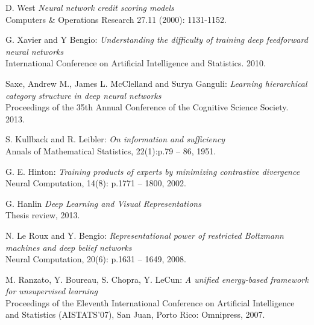 \documentclass[a4paper,11pt]{report}
\begin{document}
\begin{thebibliography}{99}
	 D. West {\em Neural network credit scoring models}\\
	Computers \& Operations Research 27.11 (2000): 1131-1152.
	
	 G. Xavier and Y Bengio: {\em Understanding the difficulty of training deep feedforward neural networks}\\
	International Conference on Artificial Intelligence and Statistics. 2010.
	
	 Saxe, Andrew M., James L. McClelland and Surya Ganguli: {\em Learning hierarchical category structure in deep neural networks}\\
	Proceedings of the 35th Annual Conference of the Cognitive Science Society. 2013.

	 S. Kullback and R. Leibler: {\em On information and sufficiency}\\
	Annals of Mathematical Statistics, 22(1):p.79 – 86, 1951.
	
	 G. E. Hinton: {\em Training products of experts by minimizing contrastive divergence}\\
	Neural Computation, 14(8): p.1771 – 1800, 2002.
	
	 G. Hanlin {\em Deep Learning and Visual Representations}\\
	Thesis review, 2013.
	
	 N. Le Roux and Y. Bengio: {\em Representational power of restricted Boltzmann machines and deep belief networks}\\
	Neural Computation, 20(6): p.1631 – 1649, 2008.
	
	 M. Ranzato, Y. Boureau, S. Chopra, Y. LeCun: {\em A unified energy-based framework for unsupervised learning}\\
	Proceedings of the Eleventh International Conference on Artificial Intelligence and Statistics (AISTATS’07), San Juan, Porto Rico: Omnipress, 2007.
\end{thebibliography}
     
\end{document}
